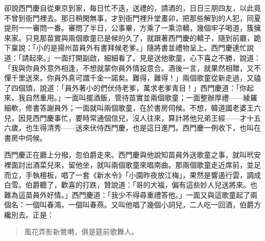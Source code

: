 卻說西門慶自從東京到家，每日忙不迭，送禮的，請酒的，日日三朋四友，以此竟不曾到衙門裡去。那日稍閑無事，才到衙門裡升堂畫卯，把那些解到的人犯，同夏提刑一一審問一番。審問了半日，公事畢，方乘了一乘涼轎，幾個牢子喝道，簇擁來家。只見那苗實與兩個歌童已是候的久了，就跟著西門慶的轎子，隨到前廳，跪下稟說：「小的是揚州苗員外有書拜候老爹。」隨將書並禮物呈上。西門慶連忙說道：「請起來。」一面打開副啟，細細看了。見是送他歌童，心下喜之不勝，說道：「我與你員外意外相逢，不想就蒙你員外情投意合。酒後一言，就果然相贈，又不憚千里送來。你員外真可謂千金一諾矣。難得，難得！」兩個歌童從新走過，又磕了四個頭，說道：「員外著小的們伏侍老爹，萬求老爹青目！」西門慶道：「你起來，我自然重用。」一面叫擺酒飯，管待苗實並兩個歌童；一面整辦厚禮——綾羅細軟，修書答謝員外；一面就叫兩個歌童，在於書房伺候。不想，韓道國老婆王六兒，因見西門慶事忙，要時常通個信兒，沒人往來，算計將他兄弟王經——才十五六歲，也生得清秀——送來伏侍西門慶，也是這日進門。西門慶一例收下，也叫在書房中伺候。

西門慶正在廳上分撥，忽伯爵走來。西門慶與他說知苗員外送歌童之事，就叫玳安裡面討出酒菜兒來，留他坐，就叫兩個歌童來唱南曲。那兩個歌童走近席前，並足而立，手執檀板，唱了一套《新水令》「小園昨夜放江梅」，果然是響遏行雲，調成白雪。伯爵聽了，歡喜的打跌，贊說道：「哥的大福，偏有這些妙人兒送將來。也難為這苗員外好情。」西門慶道：「我少不得尋重禮答他。」一面又與這歌童起了兩個名：一個叫春鴻，一個叫春燕。又叫他唱了幾個小詞兒，二人吃一回酒，伯爵方纔別去。正是：
\begin{quote}
風花弄影新鶯囀，俱是筵前歌舞人。
\end{quote}
